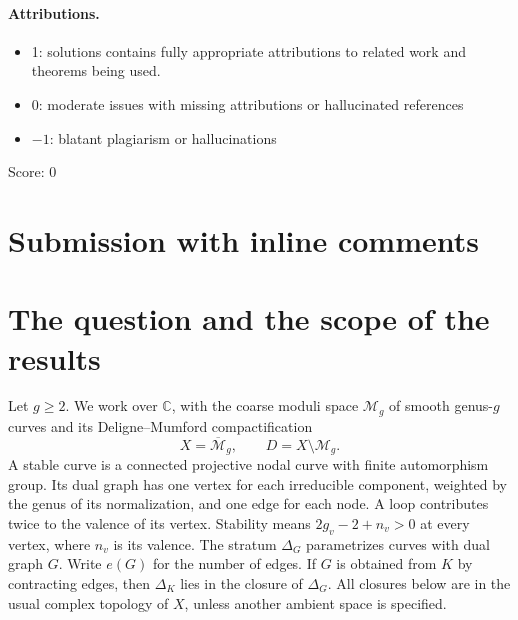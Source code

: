 \documentclass[11pt]{article}
\newcommand{\M}{\mathcal M}
\newcommand{\Mb}{\overline{\mathcal M}}
\newcommand{\C}{\mathbb C}
\theoremstyle{definition}
\theoremstyle{remark}
\begin{document}
\paragraph{Attributions.}
\begin{itemize}
	\item  1: solutions contains fully appropriate attributions
		to related work and theorems being used.
	\item  0: moderate issues with missing attributions or hallucinated references
	\item  $-1$: blatant plagiarism or hallucinations
\end{itemize}

\noindent Score: 0

\newpage
\section{Submission with inline comments}


\begin{abstract}
We consider deformations of a smooth totally geodesic surface in the moduli space of curves, with smoothly trivial intersections with every boundary stratum and a compatibility condition on incidences in fixed open sets. The question is whether a pointed component that is constant along a boundary curve must also be constant in the deformation parameter. We prove that, if this selected factor changes, compatibility forces the whole boundary curve into the closures of all larger incident boundary strata. If the compactified fibers are algebraic surfaces with no component contained in the boundary, this proves the desired constancy for strata with at least two nodes. A second criterion proves constancy whenever the boundary curves have a common stable limit; isolated-point conditions imply this criterion in several cases. We also analyze the ambiguity at a two-node separating chain and give examples delimiting compactification and lifting arguments. The original assertion, without the additional conditions in these criteria, remains unresolved here.
\end{abstract}

\section{The question and the scope of the results}

Let $g\geq2$. We work over $\C$, with the coarse moduli space $\M_g$ of smooth genus-$g$ curves and its Deligne--Mumford compactification
\[
 X=\Mb_g,\qquad D=X\setminus\M_g.
\]
A stable curve is a connected projective nodal curve with finite automorphism group. Its dual graph has one vertex for each irreducible component, weighted by the genus of its normalization, and one edge for each node. A loop contributes twice to the valence of its vertex. Stability means $2g_v-2+n_v>0$ at every vertex, where $n_v$ is its valence. The stratum $\Delta_G$ parametrizes curves with dual graph $G$. Write $e(G)$ for the number of edges. If $G$ is obtained from $K$ by contracting edges, then $\Delta_K$ lies in the closure of $\Delta_G$. All closures below are in the usual complex topology of $X$, unless another ambient space is specified.
\end{document}
